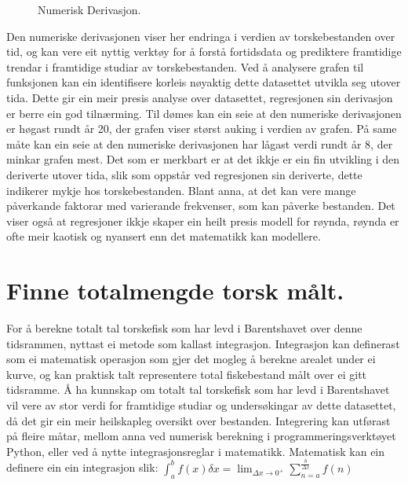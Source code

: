 \documentclass{report}
\begin{document}
\begin{figure}[H]
    \centering
    \caption{Numerisk Derivasjon.}
    \label{F4}
\end{figure}

Den numeriske derivasjonen viser her endringa i verdien av torskebestanden over tid, og kan vere eit nyttig verktøy for å forstå fortidsdata og prediktere framtidige trendar i framtidige studiar av torskebestanden.
Ved å analysere grafen til funksjonen kan ein identifisere korleis nøyaktig dette datasettet utvikla seg utover tida. Dette gir ein meir presis analyse over datasettet, regresjonen sin derivasjon er berre ein god tilnærming. Til dømes kan ein seie at den numeriske derivasjonen er høgast rundt år 20, der grafen viser størst auking i verdien av grafen.
På same måte kan ein seie at den numeriske derivasjonen har lågast verdi rundt år 8, der minkar grafen mest. 
Det som er merkbart er at det ikkje er ein fin utvikling i den deriverte utover tida, slik som oppstår ved regresjonen sin deriverte, dette indikerer mykje hos torskebestanden. Blant anna, at det kan vere mange påverkande faktorar med varierande frekvenser, som kan påverke bestanden.
Det viser også at regresjoner ikkje skaper ein heilt presis modell for røynda, røynda er ofte meir kaotisk og nyansert enn det matematikk kan modellere.
\section{Finne totalmengde torsk målt.}
For å berekne totalt tal torskefisk som har levd i Barentshavet over denne tidsrammen, nyttast ei metode som kallast integrasjon.
Integrasjon kan definerast som ei matematisk operasjon som gjer det mogleg å berekne arealet under ei kurve, og kan praktisk talt representere total fiskebestand målt over ei gitt tidsramme.
Å ha kunnskap om totalt tal torskefisk som har levd i Barentshavet vil vere av stor verdi for framtidige studiar og undersøkingar av dette datasettet, då det gir ein meir heilskapleg oversikt over bestanden.
Integrering kan utførast på fleire måtar, mellom anna ved numerisk berekning i programmeringsverktøyet Python, eller ved å nytte integrasjonsreglar i matematikk.
Matematisk kan ein definere ein ein integrasjon slik: $\int_{a}^{b}f(x)\delta x=\lim_{\Delta x \rightarrow 0^{+}}\sum_{n=a}^{\frac{b}{\Delta x}}f(n)$
\end{document}

